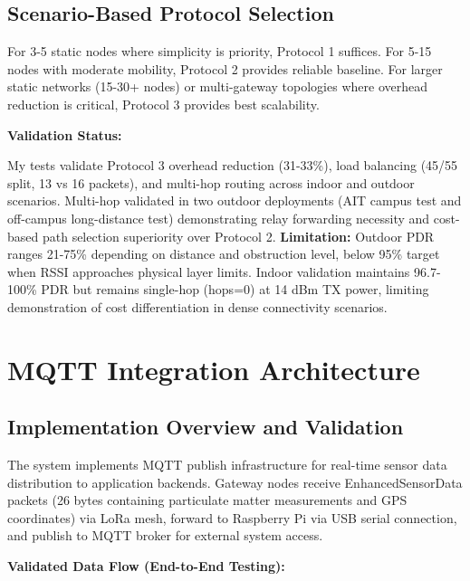 \subsection{Scenario-Based Protocol Selection}

For 3-5 static nodes where simplicity is priority, Protocol 1 suffices. For 5-15 nodes with moderate mobility, Protocol 2 provides reliable baseline. For larger static networks (15-30+ nodes) or multi-gateway topologies where overhead reduction is critical, Protocol 3 provides best scalability.

\textbf{Validation Status:}

My tests validate Protocol 3 overhead reduction (31-33\%), load balancing (45/55 split, 13 vs 16 packets), and multi-hop routing across indoor and outdoor scenarios. Multi-hop validated in two outdoor deployments (AIT campus test and off-campus long-distance test) demonstrating relay forwarding necessity and cost-based path selection superiority over Protocol 2. \textbf{Limitation:} Outdoor PDR ranges 21-75\% depending on distance and obstruction level, below 95\% target when RSSI approaches physical layer limits. Indoor validation maintains 96.7-100\% PDR but remains single-hop (hops=0) at 14 dBm TX power, limiting demonstration of cost differentiation in dense connectivity scenarios.

\section{MQTT Integration Architecture}
\label{sec:mqtt-integration}

\subsection{Implementation Overview and Validation}

The system implements MQTT publish infrastructure for real-time sensor data distribution to application backends. Gateway nodes receive EnhancedSensorData packets (26 bytes containing particulate matter measurements and GPS coordinates) via LoRa mesh, forward to Raspberry Pi via USB serial connection, and publish to MQTT broker for external system access.

\textbf{Validated Data Flow (End-to-End Testing):}

